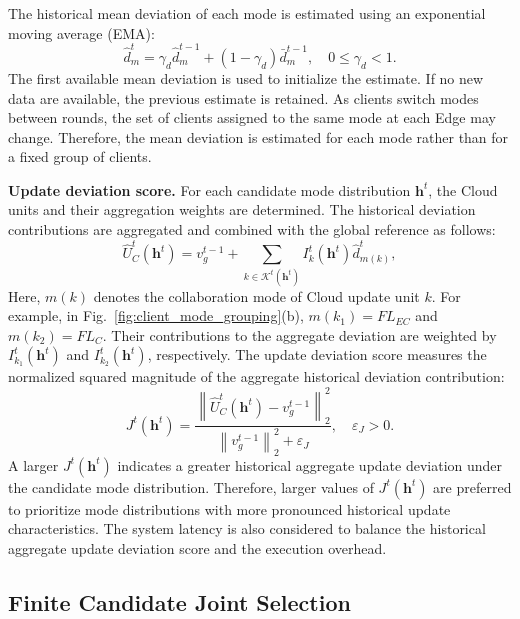 \documentclass[5p,times]{elsarticle}
\theoremstyle{plain}
\theoremstyle{definition}
\theoremstyle{remark}
\begin{document}
	The historical mean deviation of each mode is estimated
	using an exponential moving average (EMA):
	\begin{equation}
		\widehat d_m^t
		=\gamma_d\widehat d_m^{t-1}
		+(1-\gamma_d)\bar d_m^{t-1},
		\quad 0\leq\gamma_d<1.
		\label{eq:mode_deviation_ema}
	\end{equation}
	The first available mean deviation is used to initialize
	the estimate. If no new data are available, the previous
	estimate is retained.
	As clients switch modes between rounds, the set of clients
	assigned to the same mode at each Edge may change.
	Therefore, the mean deviation is estimated for each mode
	rather than for a fixed group of clients.
	
	\textbf{Update deviation score.}
	For each candidate mode distribution $\mathbf h^t$,
	the Cloud units and their aggregation weights are determined.
	The historical deviation contributions are aggregated
	and combined with the global reference as follows:
	\begin{equation}
		\widehat U_C^t(\mathbf h^t)
		=v_g^{t-1}
		+\sum_{k\in\mathcal K^t(\mathbf h^t)}
		I_k^t(\mathbf h^t)\widehat d_{m(k)}^t,
		\label{eq:predicted_cloud_update}
	\end{equation}
	Here, $m(k)$ denotes the collaboration mode
	of Cloud update unit $k$.
	For example, in Fig.~\ref{fig:client_mode_grouping}(b),
	$m(k_1)=FL_{EC}$ and $m(k_2)=FL_C$.
	Their contributions to the aggregate deviation
	are weighted by $I_{k_1}^t(\mathbf h^t)$
	and $I_{k_2}^t(\mathbf h^t)$, respectively.
	The update deviation score measures the normalized
	squared magnitude of the aggregate historical
	deviation contribution:
	\begin{equation}
		J^t(\mathbf h^t)
		=\frac{\left\|\widehat U_C^t(\mathbf h^t)
			-v_g^{t-1}\right\|_2^2}
		{\left\|v_g^{t-1}\right\|_2^2+\varepsilon_J},
		\quad\varepsilon_J>0.
		\label{eq:j_learn_estimate}
	\end{equation}
	A larger $J^t(\mathbf h^t)$ indicates a greater
	historical aggregate update deviation under
	the candidate mode distribution.
	Therefore, larger values of $J^t(\mathbf h^t)$
	are preferred to prioritize mode distributions
	with more pronounced historical update
	characteristics.
	The system latency is also considered to
	balance the historical aggregate update
	deviation score and the execution overhead.
	
	\subsection{Finite Candidate Joint Selection}
	\label{sec:global_optimization}
	
\end{document}
